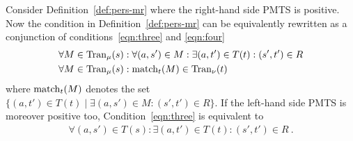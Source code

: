 \begin{lemma} \label{lem:ref-positive}
Consider Definition~\ref{def:pers-mr} where the right-hand side PMTS
is positive.
Now the condition in Definition~\ref{def:pers-mr} can be equivalently 
rewritten %
as a \nopagebreak conjunction of conditions~\eqref{eqn:three} and \eqref{eqn:four}
\begin{align}
       &\forall M \in \mathrm{Tran}_{\mu}(s) : \forall (a,s') \in M : \exists
        (a,t') \in T(t) : (s',t') \in R \label{eqn:three} \\
     &\forall M \in \mathrm{Tran}_{\mu}(s) : \mathrm{match}_t(M) \in \mathrm{Tran}_{\nu}(t) \label{eqn:four}
\end{align}
where $\mathrm{match}_t(M)$ denotes the set $\{ (a,t') \in T(t) \mid \exists (a,s') \in M :
(s',t') \in R\}$.
If the left-hand side PMTS is moreover positive too, 
Condition~\eqref{eqn:three} is equivalent to
\begin{align}
\forall (a,s') \in T(s) : \exists (a,t') \in T(t) : (s',t') \in R \ .\label{eqn:five}
\end{align}
\end{lemma}
